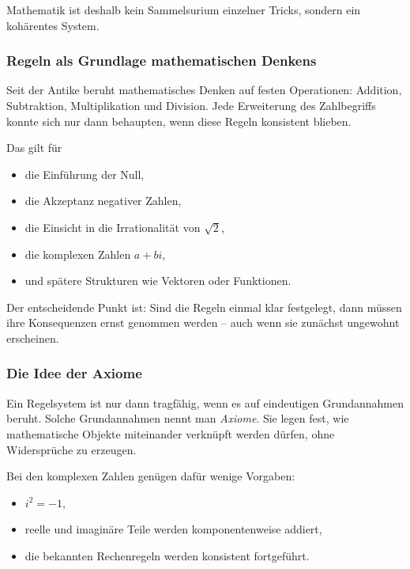 Mathematik ist deshalb kein Sammelsurium einzelner Tricks,
sondern ein kohärentes System.

\subsubsection*{Regeln als Grundlage mathematischen Denkens}
Seit der Antike
beruht mathematisches Denken auf festen Operationen:
Addition, Subtraktion,
Multiplikation und Division.
Jede Erweiterung des Zahlbegriffs
konnte sich nur dann behaupten,
wenn diese Regeln konsistent blieben.

Das gilt für
\begin{itemize}
	\item die Einführung der Null,
	\item die Akzeptanz negativer Zahlen,
	\item die Einsicht in die Irrationalität von $\sqrt{2}$,
	\item die komplexen Zahlen \(a+bi\),
	\item und spätere Strukturen wie Vektoren oder Funktionen.
\end{itemize}

Der entscheidende Punkt ist:
Sind die Regeln einmal klar festgelegt,
dann müssen ihre Konsequenzen ernst genommen werden --
auch wenn sie zunächst ungewohnt erscheinen.

\subsubsection*{Die Idee der Axiome}
Ein Regelsystem ist nur dann tragfähig,
wenn es auf eindeutigen Grundannahmen beruht.
Solche Grundannahmen nennt man \emph{Axiome}.
Sie legen fest,
wie mathematische Objekte miteinander verknüpft werden dürfen,
ohne Widersprüche zu erzeugen.

Bei den komplexen Zahlen genügen dafür wenige Vorgaben:
\begin{itemize}
	\item \(i^2 = -1\),
	\item reelle und imaginäre Teile werden komponentenweise addiert,
	\item die bekannten Rechenregeln werden konsistent fortgeführt.
\end{itemize}

